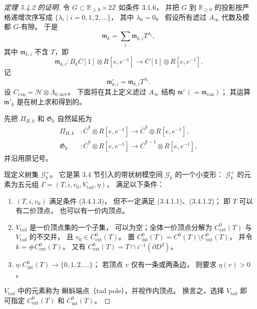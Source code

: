 \begin{proof}[定理 5.4.2 的证明]
令 $G\subset\mathbb R_{\geq0}\times2\mathbb Z$
如条件 3.1.6，
并把 $G$ 到 $\mathbb R_{\geq0}$
的投影按严格递增次序写成
$\{\lambda_i\mid i=0,1,2,\ldots\}$，
其中 $\lambda_0=0$。
假设所有滤过 $A_\infty$ 代数及模都 $G$-有隙。
于是
\begin{equation}
\mathfrak m_k
=\sum_i\mathfrak m_{k,i}T^{\lambda_i},
\tag{5.4.30.1}\label{eq:5-4-30-1}
\end{equation}
其中 $\mathfrak m_{k,i}$ 不含 $T$，即
\[
\mathfrak m_{k,i}\colon
B_k\overline C[1]\otimes R[e,e^{-1}]
\longrightarrow\overline C[1]\otimes R[e,e^{-1}].
\]
记
\begin{equation}
\mathfrak m_{k,i}^{\circ}
=\mathfrak m_{k,i}T^{\lambda_i}.
\tag{5.4.30.2}\label{eq:5-4-30-2}
\end{equation}
设 $C_{\mathrm{can}}=\mathcal H\otimes\Lambda_{0,\mathrm{nov}}$。
下面将在其上定义滤过 $A_\infty$ 结构
$\mathfrak m'\,(=\mathfrak m_{\mathrm{can}})$；
其运算 $\mathfrak m'_k$ 是在树上求和得到的。

先把 $\Pi_{H,k}$ 和 $\mathfrak G_k$
自然延拓为
\[
\begin{aligned}
\Pi_{H,k}&\colon
\overline C^k\otimes R[e,e^{-1}]
\longrightarrow\overline C^k\otimes R[e,e^{-1}],\\
\mathfrak G_k&\colon
\overline C^k\otimes R[e,e^{-1}]
\longrightarrow\overline C^{k-1}\otimes R[e,e^{-1}],
\end{aligned}
\]
并沿用原记号。

现定义树集 $\mathcal G_k^+$。
它是第 3.4 节引入的带状树模空间
$\mathcal G_k$ 的一个小变形：
$\mathcal G_k^+$ 的元素为五元组
$\Gamma=(T,i,v_0,V_{\mathrm{tad}},\eta)$，
满足以下条件：
\begin{enumerate}
\item[\textup{(5.4.31.1)}]\label{cond:5-4-31-1}
$(T,i,v_0)$ 满足条件 (3.4.1.3)，
但不一定满足 (3.4.1.1)、(3.4.1.2)；
即 $T$ 可以有二价顶点，
也可以有一价内顶点。
\item[\textup{(5.4.31.2)}]\label{cond:5-4-31-2}
$V_{\mathrm{tad}}$ 是一价顶点集的一个子集，
可以为空；全体一价顶点分解为
$C^0_{\mathrm{ext}}(T)$ 与
$V_{\mathrm{tad}}$ 的不交并，
且 $v_0\in C^0_{\mathrm{ext}}(T)$。
置 $C^0_{\mathrm{int}}(T)=
C^0(T)\setminus C^0_{\mathrm{ext}}(T)$，
并令 $k=\#C^0_{\mathrm{ext}}(T)$。
又有
$C^0_{\mathrm{ext}}(T)
=T\cap i^{-1}(\partial D^2)$。
\item[\textup{(5.4.31.3)}]\label{cond:5-4-31-3}
$\eta\colon C^0_{\mathrm{int}}(T)
\to\{0,1,2,\ldots\}$；
若顶点 $v$ 仅有一条或两条边，
则要求 $\eta(v)>0$。
\end{enumerate}
$V_{\mathrm{tad}}$ 中的元素称为
蝌蚪端点（tad pole），并视作内顶点。
换言之，选择 $V_{\mathrm{tad}}$
即可指定 $C^0_{\mathrm{ext}}(T)$
和 $C^0_{\mathrm{int}}(T)$。


\end{proof}
